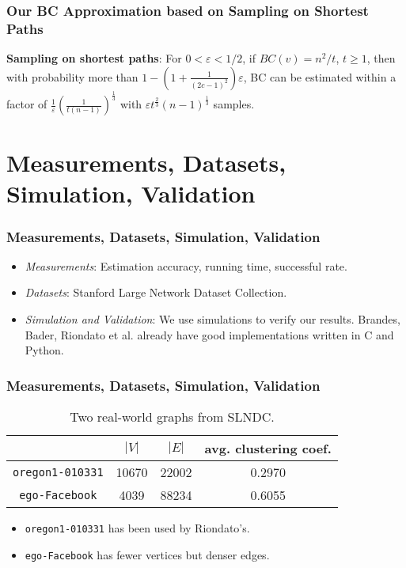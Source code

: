 \documentclass[12pt]{beamer}
\begin{document}
\begin{frame}
	\frametitle{Our BC Approximation based on Sampling on Shortest Paths}	
	{\bf Sampling on shortest paths}: For $0<\varepsilon < 1/2$, if $BC(v) = n^2/t$, $t\geq 1$, then with probability more than $1-\left(1+\frac{1}{(2c-1)^2}\right)\varepsilon$, BC can be estimated within a factor of $\frac{1}{\varepsilon}\left(\frac{1}{t(n-1)}\right)^{\frac{1}{3}}$ with $\varepsilon t^{\frac{2}{3}}(n-1)^{\frac{1}{3}}$ samples.
\end{frame}

\section{Measurements, Datasets, Simulation, Validation}
\begin{frame}
	\frametitle{Measurements, Datasets, Simulation, Validation}
	\begin{itemize}
	\item {\it Measurements}: Estimation accuracy, running time, successful rate.
	\item {\it Datasets}: Stanford Large Network Dataset Collection.
	\item {\it Simulation and Validation}: We use simulations to verify our results. Brandes, Bader, Riondato et al. already have good implementations written in C and Python.
	\end{itemize}
\end{frame}

\begin{frame}
\frametitle{Measurements, Datasets, Simulation, Validation}
\begin{table}[!t]
\centering
\begin{tabular}{c || c | c | c}
 & $|V|$ & $|E|$ & avg. clustering coef.\\
\hline
\texttt{oregon1-010331} & 10670 & 22002 & 0.2970 \\
\texttt{ego-Facebook} & 4039 & 88234 & 0.6055 \\
\end{tabular}
\caption{Two real-world graphs from SLNDC.}
\end{table}
\begin{itemize}
\item \texttt{oregon1-010331} has been used by Riondato's.
\item \texttt{ego-Facebook} has fewer vertices but denser edges.
\end{itemize}
\end{frame}
\end{document}
